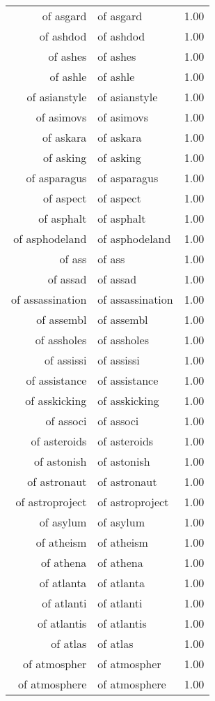 \begin{table}[ht]
\begin{tabular}{rlr}
  of asgard & of asgard & 1.00 \\ 
  of ashdod & of ashdod & 1.00 \\ 
  of ashes & of ashes & 1.00 \\ 
  of ashle & of ashle & 1.00 \\ 
  of asianstyle & of asianstyle & 1.00 \\ 
  of asimovs & of asimovs & 1.00 \\ 
  of askara & of askara & 1.00 \\ 
  of asking & of asking & 1.00 \\ 
  of asparagus & of asparagus & 1.00 \\ 
  of aspect & of aspect & 1.00 \\ 
  of asphalt & of asphalt & 1.00 \\ 
  of asphodeland & of asphodeland & 1.00 \\ 
  of ass & of ass & 1.00 \\ 
  of assad & of assad & 1.00 \\ 
  of assassination & of assassination & 1.00 \\ 
  of assembl & of assembl & 1.00 \\ 
  of assholes & of assholes & 1.00 \\ 
  of assissi & of assissi & 1.00 \\ 
  of assistance & of assistance & 1.00 \\ 
  of asskicking & of asskicking & 1.00 \\ 
  of associ & of associ & 1.00 \\ 
  of asteroids & of asteroids & 1.00 \\ 
  of astonish & of astonish & 1.00 \\ 
  of astronaut & of astronaut & 1.00 \\ 
  of astroproject & of astroproject & 1.00 \\ 
  of asylum & of asylum & 1.00 \\ 
  of atheism & of atheism & 1.00 \\ 
  of athena & of athena & 1.00 \\ 
  of atlanta & of atlanta & 1.00 \\ 
  of atlanti & of atlanti & 1.00 \\ 
  of atlantis & of atlantis & 1.00 \\ 
  of atlas & of atlas & 1.00 \\ 
  of atmospher & of atmospher & 1.00 \\ 
  of atmosphere & of atmosphere & 1.00 \\ 

\end{tabular}
\end{table}
